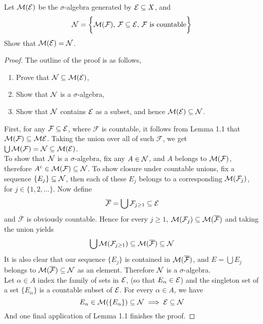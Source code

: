 \documentclass[../../main.tex]{subfiles}
\begin{document}
\begin{wts}
    Let $\mathcal{M}(\mathcal{E})$ be the $\sigma$-algebra generated by $\mathcal{E}\subseteq X$, and 
    \[
    \mathcal{N} =\biggl\{\mathcal{M} (\mathcal{F}),\, \mathcal{F}\subseteq \mathcal{E},\, \mathcal{F} \text{ is countable}\biggr\}
    \]
    Show that $\mathcal{M}(\mathcal{E}) = \mathcal{N}$.
\end{wts}
\begin{proof}
    The outline of the proof is as follows,
    \begin{enumerate}
        \item Prove that $\mathcal{N} \subseteq \mathcal{M}(\mathcal{E})$,
        \item Show that $\mathcal{N}$ is a $\sigma$-algebra,
        \item Show that $\mathcal{N}$ contains $\mathcal{E}$ as a subset, and hence $\mathcal{M}(\mathcal{E})\subseteq \mathcal{N}$.
    \end{enumerate}
    First, for any $\mathcal{F}\subseteq \mathcal{E}$, where $\mathcal{F}$ is countable, it follows from Lemma 1.1 that $\mathcal{M}(\mathcal{F})\subseteq\mathcal{M}{\mathcal{E}}$. Taking the union over all of such $\mathcal{F}$, we get $\bigcup \mathcal{M}(\mathcal{F})=\mathcal{N}\subseteq \mathcal{M}(\mathcal{E})$.\\
    
    To show that $\mathcal{N}$ is a $\sigma$-algebra, fix any $A\in \mathcal{N}$, and $A$ belongs to $\mathcal{M}(\mathcal{F})$, therefore $A^c\in\mathcal{M}(\mathcal{F})\subseteq \mathcal{N}$. To show closure under countable unions, fix a sequence $\{E_j\}\subseteq\mathcal{N}$, then each of these $E_j$ belongs to a corresponding $\mathcal{M}(\mathcal{F}_j)$, for $j\in \{1,2,\ldots\}$. Now define 
    \[
    \overline{\mathcal{F}} = \bigcup \mathcal{F}_{j\geq 1}\subseteq \mathcal{E}
    \]
    and $\overline{\mathcal{F}}$ is obviously countable. Hence for every $j\geq 1$, $\mathcal{M}(\mathcal{F}_j)\subseteq \mathcal{M}(\overline{\mathcal{F}})$ and taking the union yields
    \[
    \bigcup \mathcal{M}(\mathcal{F}_{j\geq 1})\subseteq \mathcal{M} (\overline{\mathcal{F}})\subseteq \mathcal{N}
    \]
    It is also clear that our sequence $\{E_j\}$ is contained in $\mathcal{M}(\overline{\mathcal{F}})$, and $E=\bigcup E_j$ belongs to $\mathcal{M}(\overline{\mathcal{F}})\subseteq\mathcal{N}$ as an element. Therefore $\mathcal{N}$ is a $\sigma$-algebra.\\
    
    Let $\alpha\in A$ index the family of sets in $\mathcal{E}$, (so that $E_\alpha\in\mathcal{E}$) and the singleton set of a set $\{E_\alpha\}$ is a countable subset of $\mathcal{E}$. For every $\alpha\in A$, we have
    \[
    E_\alpha\in\mathcal{M}(\{E_\alpha\})\subseteq\mathcal{N}\implies \mathcal{E}\subseteq\mathcal{N}
    \]
    And one final application of Lemma 1.1 finishes the proof.
\end{proof}
\newpage
\end{document}
